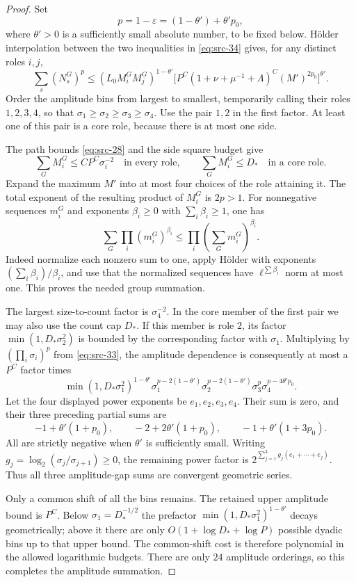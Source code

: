 \begin{proof}
Set
\[
 p=1-\varepsilon=(1-\theta')+\theta'p_0,
\]
where $\theta'>0$ is a sufficiently small absolute number, to be
fixed below.  H\"older interpolation between the two inequalities
in \eqref{eq:src-34} gives, for any distinct roles $i,j$,
\[
 \sum_s(N_s^G)^p
 \leq
 (L_0M_i^GM_j^G)^{1-\theta'}
 \big[P^C(1+\nu+\mu^{-1}+\Lambda)^C
                     (M')^{2p_0}\big]^{\theta'}.
\]
Order the amplitude bins from largest to smallest, temporarily
calling their roles $1,2,3,4$, so that
$\sigma_1\geq\sigma_2\geq\sigma_3\geq\sigma_4$.
Use the pair $1,2$ in the first factor.  At least one of this pair
is a core role, because there is at most one side.

The path bounds \eqref{eq:src-28} and the side square budget give
\[
 \sum_G M_i^G\leq CP^C\sigma_i^{-2}
 \quad\text{in every role},\qquad
 \sum_G M_i^G\leq D_*
 \quad\text{in a core role}.
\]
Expand the maximum $M'$ into at most four choices of the role
attaining it.  The total exponent of the resulting product of
$M_i^G$ is $2p>1$.  For nonnegative sequences $m_i^G$ and
exponents $\beta_i\geq0$ with $\sum_i\beta_i\geq1$, one has
\[
 \sum_G\prod_i(m_i^G)^{\beta_i}
 \leq\prod_i\left(\sum_Gm_i^G\right)^{\beta_i}.
\]
Indeed normalize each nonzero sum to one, apply H\"older with
exponents $(\sum_i\beta_i)/\beta_i$, and use that the normalized
sequences have $\ell^{\sum\beta_i}$ norm at most one.  This proves
the needed group summation.

The largest size-to-count factor is $\sigma_4^{-2}$.  In the core
member of the first pair we may also use the count cap $D_*$.
If this member is role $2$, its factor
$\min(1,D_*\sigma_2^2)$ is bounded by the corresponding factor
with $\sigma_1$.  Multiplying by $(\prod_i\sigma_i)^p$ from
\eqref{eq:src-33}, the amplitude dependence is consequently at
most a $P^C$ factor times
\[
 \min(1,D_*\sigma_1^2)^{1-\theta'}
 \sigma_1^{p-2(1-\theta')}
 \sigma_2^{p-2(1-\theta')}
 \sigma_3^p\sigma_4^{p-4\theta'p_0}.
\]
Let the four displayed power exponents be $e_1,e_2,e_3,e_4$.
Their sum is zero, and their three preceding partial sums are
\[
 -1+\theta'(1+p_0),\qquad
 -2+2\theta'(1+p_0),\qquad
 -1+\theta'(1+3p_0).
\]
All are strictly negative when $\theta'$ is sufficiently small.
Writing $g_j=\log_2(\sigma_j/\sigma_{j+1})\geq0$, the remaining
power factor is $2^{\sum_{j=1}^3g_j(e_1+\cdots+e_j)}$.
Thus all three amplitude-gap sums are convergent geometric series.

Only a common shift of all the bins remains.  The retained upper
amplitude bound is $P^C$.  Below $\sigma_1=D_*^{-1/2}$ the
prefactor $\min(1,D_*\sigma_1^2)^{1-\theta'}$ decays geometrically;
above it there are only
$O(1+\log D_*+\log P)$ possible dyadic bins up to that upper
bound.  The common-shift cost is therefore polynomial in the
allowed logarithmic budgets.  There are only $24$ amplitude
orderings, so this completes the amplitude summation.


\end{proof}
